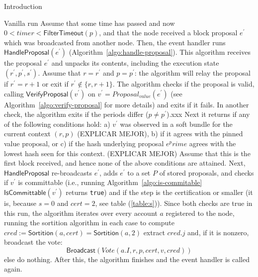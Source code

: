 \documentclass[10pt,a4paper]{article}
\begin{document}
\begin{section}{Introduction}
\begin{subsection}{Vanilla run}
Assume that some time has passed and now $0<timer<\mathsf{FilterTimeout}(p)$, and that 
the node received a block proposal $e^\prime$ which was broadcasted from another node. 
Then, the event handler runs $\mathsf{HandleProposal}(e^\prime)$ (Algorithm~\ref{algo:handle-proposal}).
This algorithm receives the proposal $e^\prime$ and unpacks its contents,
including the execution state $(r^\prime,p^\prime,s^\prime)$.
Assume that $r=r^\prime$ and $p=p^\prime$: the algorithm will relay the proposal if $r^\prime=r+1$ 
or exit if $r^\prime\notin\{r,r+1\}$.
The algorithm checks if the proposal is valid, calling $\mathsf{VerifyProposal}(v^\prime)$ 
on $v^\prime=Proposal_{value}(e^\prime)$ (see Algorithm~\ref{algo:verify-proposal} for more details) 
and exits if it fails.
In another check, the algorithm exits if the periods differ ($p\neq p^\prime$).xxx
Next it returns if any of the following conditions hold:
a) $v^\prime$ was observed in a soft bundle for the current context $(r,p)$ (EXPLICAR MEJOR),
b) if it agrees with the pinned value proposal, or
c) if the hash underlying proposal $e^prime$ agrees with the lowest hash seen for this
context. (EXPLICAR MEJOR)
Assume that this is the first block received, and hence none of the above conditions are
attained.
Next, $\mathsf{HandleProposal}$ re-broadcasts $e^\prime$, 
adds $e^\prime$ to a set $P$ of stored proposals, and 
checks if $v^\prime$ is committable (i.e., running Algorithm~\ref{algo:is-commitable} 
$\mathsf{IsCommittable}(v^\prime)$ returns {\tt true})
and if the step is the certification or smaller (it is, because $s=0$ and $cert=2$, see table (\ref{table:s})). 
Since both checks are true in this run, the algorithm iterates over every account $a$ registered 
to the node, running the sortition algorithm in each case to compute 
$cred:=\mathsf{Sortition}(a, cert)=\mathsf{Sortition}(a, 2)$
extract $cred.j$ and, if it is nonzero, broadcast the vote:
$$
    \mathsf{Broadcast}(Vote(a.I,r,p,cert,v,cred))
$$
else do nothing.
After this, the algorithm finishes and the event handler is called again.


\end{subsection}
\end{section}
\end{document}
